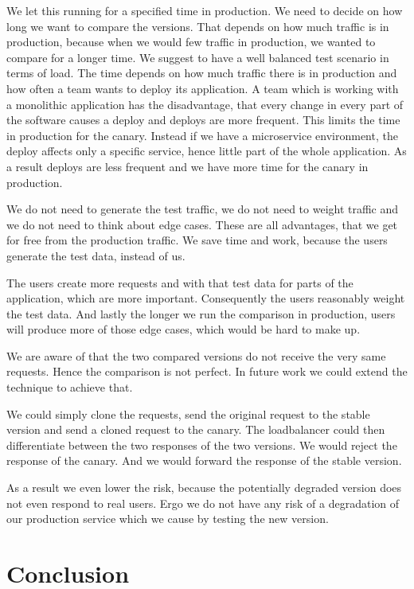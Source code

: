 We let this running for a specified time in production. We need to decide on how long we
want to compare the versions. That depends on how much traffic is in production, because
when we would few traffic in production, we wanted to compare for a longer time. We
suggest to have a well balanced test scenario in terms of load. The time depends on how
much traffic there is in production and how often a team wants to deploy its
application. A team which is working with a monolithic application has the disadvantage,
that every change in every part of the software causes a deploy and deploys are more
frequent. This limits the time in production for the canary. Instead if we have a
microservice environment, the deploy affects only a specific service, hence little part of
the whole application. As a result deploys are less frequent and we have more time for the
canary in production.

We do not need to generate the test traffic, we do not need to weight traffic and we do
not need to think about edge cases. These are all advantages, that we get for free from
the production traffic. We save time and work, because the users generate the test data,
instead of us.

The users create more requests and with that test data for parts of the application, which
are more important. Consequently the users reasonably weight the test data. And lastly the
longer we run the comparison in production, users will produce more of those edge cases,
which would be hard to make up.

We are aware of that the two compared versions do not receive the very same
requests. Hence the comparison is not perfect. In future work we could extend the
technique to achieve that.

We could simply clone the requests, send the original request to the stable version and
send a cloned request to the canary. The loadbalancer could then differentiate between the
two responses of the two versions. We would reject the response of the canary. And we
would forward the response of the stable version.

As a result we even lower the risk, because the potentially degraded version does not even
respond to real users. Ergo we do not have any risk of a degradation of our production
service which we cause by testing the new version.

\chapter{Conclusion}
